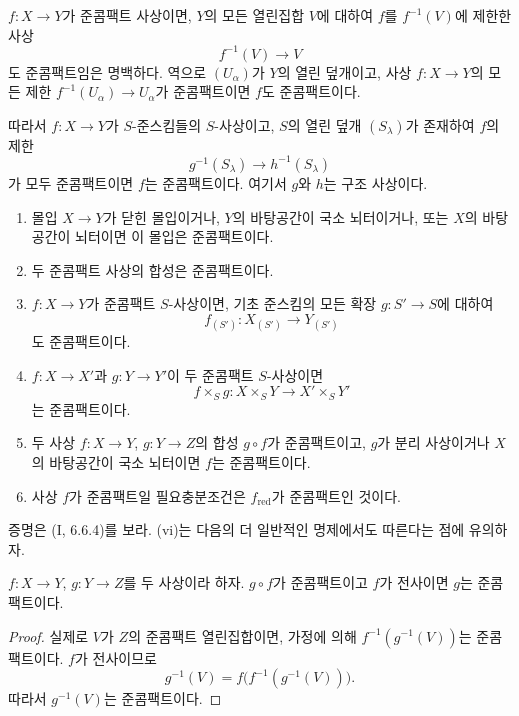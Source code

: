 $f:X\to Y$가 준콤팩트 사상이면, $Y$의 모든 열린집합 $V$에 대하여
$f$를 $f^{-1}(V)$에 제한한 사상
\[
  f^{-1}(V)\longrightarrow V
\]
도 준콤팩트임은 명백하다. 역으로 $(U_\alpha)$가 $Y$의 열린
덮개이고, 사상 $f:X\to Y$의 모든 제한
$f^{-1}(U_\alpha)\to U_\alpha$가 준콤팩트이면 $f$도 준콤팩트이다.


따라서 $f:X\to Y$가 $S$-준스킴들의 $S$-사상이고, $S$의 열린 덮개
$(S_\lambda)$가 존재하여 $f$의 제한
\[
  g^{-1}(S_\lambda)\longrightarrow h^{-1}(S_\lambda)
\]
가 모두 준콤팩트이면 $f$는 준콤팩트이다. 여기서 $g$와 $h$는 구조
사상이다.

\begin{proposition}[1.1.2]
\label{IV.1.1.2-fr}
\begin{enumerate}
  \item[(i)] 몰입 $X\to Y$가 닫힌 몰입이거나, $Y$의 바탕공간이
  국소 뇌터이거나, 또는 $X$의 바탕공간이 뇌터이면 이 몰입은
  준콤팩트이다.
  \item[(ii)] 두 준콤팩트 사상의 합성은 준콤팩트이다.
  \item[(iii)] $f:X\to Y$가 준콤팩트 $S$-사상이면, 기초 준스킴의
  모든 확장 $g:S'\to S$에 대하여
  \[
    f_{(S')}:X_{(S')}\longrightarrow Y_{(S')}
  \]
  도 준콤팩트이다.
  \item[(iv)] $f:X\to X'$과 $g:Y\to Y'$이 두 준콤팩트
  $S$-사상이면
  \[
    f\times_S g:X\times_S Y\longrightarrow X'\times_S Y'
  \]
  는 준콤팩트이다.
  \item[(v)] 두 사상 $f:X\to Y$, $g:Y\to Z$의 합성 $g\circ f$가
  준콤팩트이고, $g$가 분리 사상이거나 $X$의 바탕공간이 국소
  뇌터이면 $f$는 준콤팩트이다.
  \item[(vi)] 사상 $f$가 준콤팩트일 필요충분조건은
  $f_{\mathrm{red}}$가 준콤팩트인 것이다.
\end{enumerate}
\end{proposition}

증명은 (I, 6.6.4)를 보라. (vi)는 다음의 더 일반적인 명제에서도
따른다는 점에 유의하자.

\begin{proposition}[1.1.3]
\label{IV.1.1.3-fr}
$f:X\to Y$, $g:Y\to Z$를 두 사상이라 하자. $g\circ f$가
준콤팩트이고 $f$가 전사이면 $g$는 준콤팩트이다.
\end{proposition}

\begin{proof}
실제로 $V$가 $Z$의 준콤팩트 열린집합이면, 가정에 의해
$f^{-1}(g^{-1}(V))$는 준콤팩트이다. $f$가 전사이므로
\[
  g^{-1}(V)=f\bigl(f^{-1}(g^{-1}(V))\bigr).
\]
따라서 $g^{-1}(V)$는 준콤팩트이다.
\end{proof}

